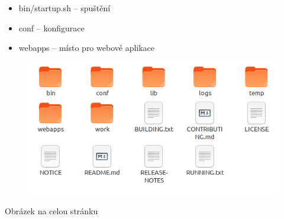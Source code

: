 \documentclass{beamer}							%
\begin{document}
\begin{frame}{}
	\begin{itemize}
		\item bin/startup.sh -- spuštění
		\item conf -- konfigurace
		\item webapps -- místo pro webové aplikace
	\end{itemize}

	\begin{figure}[htp]
		\includegraphics[width=\linewidth]{images/tomcat-webapps.png}
	\end{figure}
\end{frame}
\begin{frame}{Obrázek na celou stránku}
\end{frame}
\end{document}
